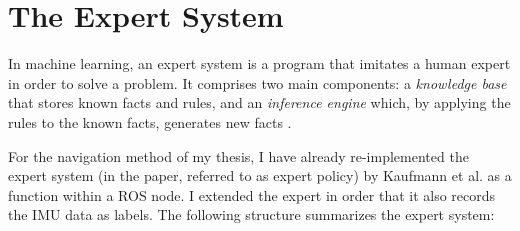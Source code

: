 %



\section{The Expert System}\label{sec:expert_system}

In machine learning, an expert system is a program that imitates a human expert in order to solve a problem. 
It comprises two main components: a \textit{knowledge base} that stores known facts and rules, and an
\textit{inference engine} which, by applying the rules to the known facts,
generates new facts \cite{jackson1986introduction}.

For the navigation method of my thesis, 
I have already re-implemented the expert system (in the paper, referred to as expert policy) 
by Kaufmann et al. \cite{Kaufmann2018} as a function within a ROS node. 
I extended the expert in order that it also records the IMU data as labels. 
The following structure summarizes the expert system:

